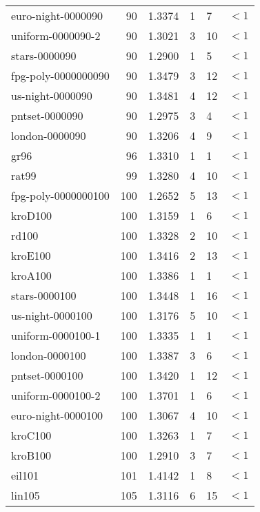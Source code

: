 \begin{longtable}{|lrrlll|}
euro-night-0000090 & 90 & \num{1.3374} & \num{1} & \num{7} & $<1$ \\
uniform-0000090-2 & 90 & \num{1.3021} & \num{3} & \num{10} & $<1$ \\
stars-0000090 & 90 & \num{1.2900} & \num{1} & \num{5} & $<1$ \\
fpg-poly-0000000090 & 90 & \num{1.3479} & \num{3} & \num{12} & $<1$ \\
us-night-0000090 & 90 & \num{1.3481} & \num{4} & \num{12} & $<1$ \\
pntset-0000090 & 90 & \num{1.2975} & \num{3} & \num{4} & $<1$ \\
london-0000090 & 90 & \num{1.3206} & \num{4} & \num{9} & $<1$ \\
gr96 & 96 & \num{1.3310} & \num{1} & \num{1} & $<1$ \\
rat99 & 99 & \num{1.3280} & \num{4} & \num{10} & $<1$ \\
fpg-poly-0000000100 & 100 & \num{1.2652} & \num{5} & \num{13} & $<1$ \\
kroD100 & 100 & \num{1.3159} & \num{1} & \num{6} & $<1$ \\
rd100 & 100 & \num{1.3328} & \num{2} & \num{10} & $<1$ \\
kroE100 & 100 & \num{1.3416} & \num{2} & \num{13} & $<1$ \\
kroA100 & 100 & \num{1.3386} & \num{1} & \num{1} & $<1$ \\
stars-0000100 & 100 & \num{1.3448} & \num{1} & \num{16} & $<1$ \\
us-night-0000100 & 100 & \num{1.3176} & \num{5} & \num{10} & $<1$ \\
uniform-0000100-1 & 100 & \num{1.3335} & \num{1} & \num{1} & $<1$ \\
london-0000100 & 100 & \num{1.3387} & \num{3} & \num{6} & $<1$ \\
pntset-0000100 & 100 & \num{1.3420} & \num{1} & \num{12} & $<1$ \\
uniform-0000100-2 & 100 & \num{1.3701} & \num{1} & \num{6} & $<1$ \\
euro-night-0000100 & 100 & \num{1.3067} & \num{4} & \num{10} & $<1$ \\
kroC100 & 100 & \num{1.3263} & \num{1} & \num{7} & $<1$ \\
kroB100 & 100 & \num{1.2910} & \num{3} & \num{7} & $<1$ \\
eil101 & 101 & \num{1.4142} & \num{1} & \num{8} & $<1$ \\
lin105 & 105 & \num{1.3116} & \num{6} & \num{15} & $<1$ \\

\end{longtable}
